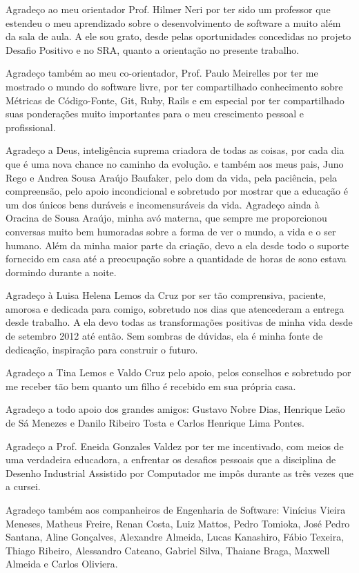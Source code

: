 \begin{agradecimentos}
Agradeço ao meu orientador Prof. Hilmer Neri por ter sido um professor que estendeu o meu aprendizado sobre o desenvolvimento de software a muito além da sala de aula. A ele sou grato, desde pelas oportunidades concedidas no projeto Desafio Positivo e no SRA, quanto a orientação no presente trabalho. 

Agradeço também ao meu co-orientador, Prof. Paulo Meirelles por ter me mostrado o mundo do software livre, por ter compartilhado conhecimento sobre Métricas de Código-Fonte, Git, Ruby, Rails e em especial por ter compartilhado suas ponderações muito importantes para o meu crescimento pessoal e profissional.

Agradeço a Deus, inteligência suprema criadora de todas as coisas, por cada dia que é uma nova chance no caminho da evolução.  e também aos meus pais, Juno Rego e Andrea Sousa Araújo Baufaker, pelo dom da vida, pela paciência, pela compreensão, pelo apoio incondicional e sobretudo por mostrar que a educação é um dos únicos bens duráveis e incomensuráveis da vida. Agradeço ainda à Oracina de Sousa Araújo, minha avó materna, que sempre me proporcionou conversas muito bem humoradas sobre a forma de ver o mundo, a vida e o ser humano. Além da minha maior parte da criação, devo a ela desde todo o suporte fornecido em casa até a preocupação sobre a quantidade de horas de sono estava dormindo durante a noite.

Agradeço à Luisa Helena Lemos da Cruz por ser tão comprensiva, paciente, amorosa e dedicada para comigo, sobretudo nos dias que atencederam a entrega desde trabalho. A ela devo todas as transformações positivas de minha vida desde de setembro 2012 até então. Sem sombras de dúvidas, ela é minha fonte de dedicação, inspiração para construir o futuro. 

Agradeço a Tina Lemos e Valdo Cruz pelo apoio, pelos conselhos e sobretudo por me receber tão bem quanto um filho é recebido em sua própria casa.

Agradeço a todo apoio dos grandes amigos: Gustavo Nobre Dias, Henrique Leão de Sá Menezes e Danilo Ribeiro Tosta e Carlos Henrique Lima Pontes.


Agradeço a Prof. Eneida Gonzales Valdez por ter me incentivado, com meios de uma verdadeira educadora, a enfrentar os desafios pessoais que a disciplina de Desenho Industrial Assistido por Computador me impôs durante as três vezes que a cursei.

Agradeço também aos companheiros de Engenharia de Software: Vinícius Vieira Meneses, Matheus Freire, Renan Costa, Luiz Mattos, Pedro Tomioka, José Pedro Santana, Aline Gonçalves, Alexandre Almeida, Lucas Kanashiro, Fábio Texeira, Thiago Ribeiro, Alessandro Cateano, Gabriel Silva, Thaiane Braga, Maxwell Almeida e Carlos Oliviera. 

\end{agradecimentos}
